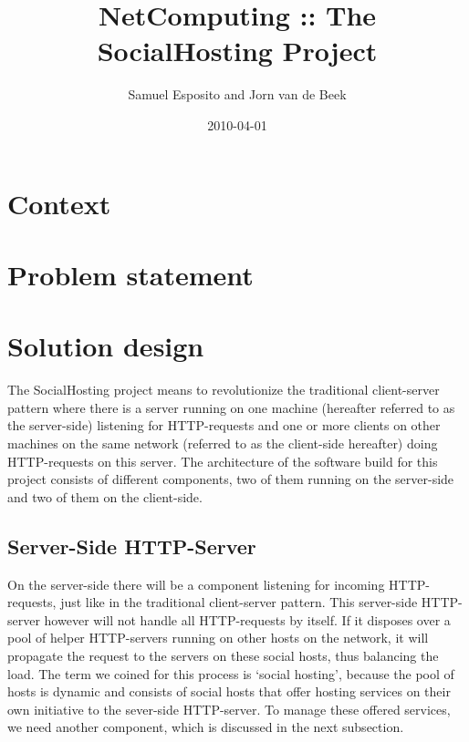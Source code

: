 \documentclass[a4paper, 10pt]{article}
\title{NetComputing :: The SocialHosting Project}
\author{Samuel Esposito and Jorn van de Beek}
\date{2010-04-01}
\begin{document}
\ifpdf
{}
\else
{}
\fi

\maketitle

\section{Context}

\section{Problem statement}

\section{Solution design}

The SocialHosting project means to revolutionize the traditional client-server pattern where there is a server running on one machine (hereafter referred to as the server-side) listening for HTTP-requests and one or more clients on other machines on the same network (referred to as the client-side hereafter) doing HTTP-requests on this server. The architecture of the software build for this project consists of different components, two of them running on the server-side and two of them on the client-side. 

\subsection{Server-Side HTTP-Server}
On the server-side there will be a component listening for incoming HTTP-requests, just like in the traditional client-server pattern. This server-side HTTP-server however will not handle all HTTP-requests by itself. If it disposes over a pool of helper HTTP-servers running on other hosts on the network, it will propagate the request to the servers on these social hosts, thus balancing the load. The term we coined for this process is `social hosting', because the pool of hosts is dynamic and consists of social hosts that offer hosting services on their own initiative to the sever-side HTTP-server. To manage these offered services, we need another component, which is discussed in the next subsection.
\end{document}
